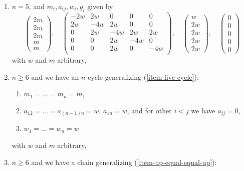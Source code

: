 \begin{lemma}
\begin{enumerate}
$$\begin{matrix}
0 \\
0 \\
0 \\
0 \\
0
\end{matrix}
\right)
$$
with $w$ and $m$ arbitrary,
\item
\label{models-item-triple-extended-down}
$n = 5$, and $m_i, a_{ij}, w_i, g_i$ given by
$$
\left(
\begin{matrix}
2m \\
2m \\
2m \\
m \\
m
\end{matrix}
\right),
\quad
\left(
\begin{matrix}
-2w & 2w & 0 & 0 & 0 \\
2w & -4w & 2w & 0 & 0 \\
0 & 2w & -4w & 2w & 2w \\
0 & 0 & 2w & -4w & 0 \\
0 & 0 & 2w & 0 & -4w \\
\end{matrix}
\right),
\quad
\left(
\begin{matrix}
w \\
2w \\
2w \\
2w \\
2w
\end{matrix}
\right),
\quad
\left(
\begin{matrix}
0 \\
0 \\
0 \\
0 \\
0
\end{matrix}
\right)
$$
with $w$ and $m$ arbitrary,
\item
\label{models-item-n-cycle}
$n \geq 6$ and we have an $n$-cycle generalizing (\ref{item-five-cycle}):
\begin{enumerate}
\item $m_1 = \ldots = m_n = m$,
\item $a_{12} = \ldots = a_{(n - 1) n} = w$, $a_{1n} = w$,
and for other $i < j$ we have $a_{ij} = 0$,
\item $w_1 = \ldots = w_n = w$
\end{enumerate}
with $w$ and $m$ arbitrary,
\item
\label{models-item-up-chain-equal-up}
$n \geq 6$ and we have a chain generalizing (\ref{item-up-equal-equal-up}):
\begin{enumerate}

\end{enumerate}
\end{enumerate}
\end{lemma}
